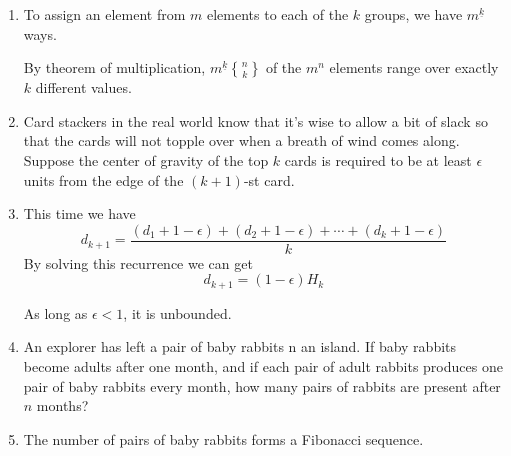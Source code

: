 \documentclass[12pt,a4paper]{article}
\makeatletter
\newtheorem*{solution}{Solution}
\theoremstyle{definition}
\renewenvironment{solution}[1][Solution] {\par\pushQED{\qed}\normalfont\topsep6\p@\@plus6\p@\relax\trivlist\item[\hskip\labelsep\bfseries#1\@addpunct{.}]\ignorespaces}{\popQED\endtrivlist\@endpefalse} \makeatother
\makeatother
\begin{document}
\begin{enumerate}
\begin{solution}
       	    To assign an element from $m$ elements to each of the $k$ groups, we have $m^{\underline{k}}$ ways.
       	    
       	    By theorem of multiplication, $m^{\underline{k}}{n \brace k}$ of the $m^n$ elements range over exactly $k$ different values.
       \end{solution}
    \item 
        Card stackers in the real world know that it's wise to allow a bit of slack so that the cards will not topple over when a breath of wind comes along. Suppose the center of gravity of the top $k$ cards is required to be at least $\epsilon$ units from the edge of the $(k+1)$-st card.
        \begin{solution}
        	This time we have 
        	\begin{equation*}
        	    d_{k+1}=\frac{(d_1+1-\epsilon)+(d_2+1-\epsilon)+\cdots+(d_k+1-\epsilon)}{k} 
        	\end{equation*}
        	By solving this recurrence we can get
        	\begin{equation*}
        	    d_{k+1}=(1-\epsilon)H_k
        	\end{equation*}
        	
        	As long as $\epsilon<1$, it is unbounded.
        	
        \end{solution}
    \item 
        An explorer has left a pair of baby rabbits n an island. If baby rabbits become adults after one month, and if each pair of adult rabbits produces one pair of baby rabbits every month, how many pairs of rabbits are present after $n$ months?
        \begin{solution}
        	The number of pairs of baby rabbits forms a Fibonacci sequence.
        	

\end{solution}
\end{enumerate}
\end{document}
